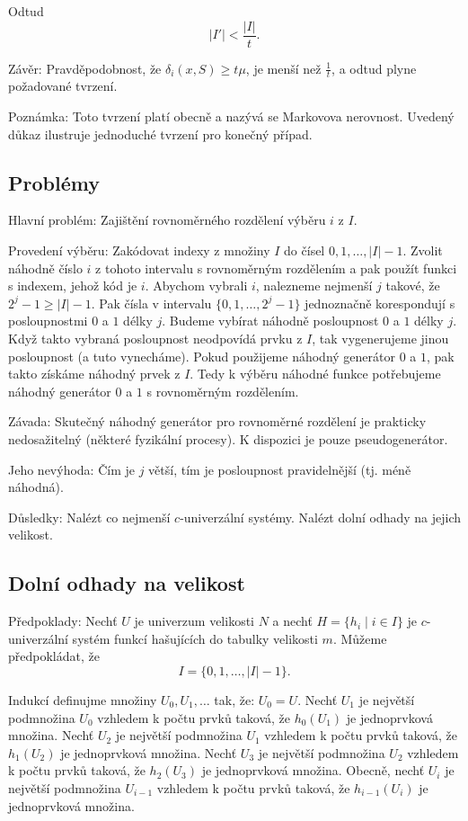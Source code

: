 \documentclass[a4paper,12pt]{article}
\begin{document}
Odtud
$$|I'|<\frac {|I|}t.$$

Závěr: Pravděpodobnost, že $\delta_i(x,S)\ge 
t\mu$, je menší 
než $\frac 1t$, a odtud plyne požadované tvrzení. 

Poznámka: Toto tvrzení platí obecně a nazývá 
se Markovova nerovnost. Uvedený důkaz 
ilustruje jednoduché tvrzení pro ko\-neč\-ný případ.

\subsection{
Problémy
}

Hlavní problém: Zajištění rovnoměrného rozdělení 
výběru $i$ z $I$.

Provedení výběru: Zak\'odovat indexy z množiny $
I$ do 
čísel $0,1,\dots,|I|-1$. Zvolit náhodně číslo $
i$ z tohoto 
intervalu s rovnoměrným rozdělením a pak použít 
funkci s indexem, jehož k\'od je $i$. Abychom vybrali $i$, nalezneme 
nejmenší $j$ takové, že $2^j-1\ge |I|-1$. Pak čísla v 
intervalu $\{0,1,\dots,2^j-1\}$ jednoznačně korespondují s 
posloupnostmi $0$ a $1$ délky $j$. Budeme vybírat náhodně 
posloupnost $0$ a $1$ délky $j$. Když takto vybraná posloupnost neodpovídá prvku z $I$, tak vygenerujeme jinou posloupnost (a tuto vynecháme). Pokud použijeme náhodný generátor $0$ a $1$, pak takto získáme náhodný prvek z $I$. Tedy k výběru náhodné funkce potřebujeme  
náhodný generátor $0$ a $1$ s rovnoměrným rozděle\-ním.

Závada: Skutečný náhodný generátor pro 
rovnoměrné rozděle\-ní je prakticky nedosažitelný 
(některé fyzikální procesy). K dispozici je pouze 
pseudogenerátor. 

Jeho nevýhoda: \v Cím je $j$ větší, tím je 
posloupnost pravidelnější (tj. méně náhodná). 

Důsledky: Nalézt co nejmenší $c$-univerzální 
systémy. Nalézt dolní odhady na jejich velikost.

\subsection{
Dolní odhady na velikost
}

Předpoklady: Nechť $U$ je univerzum velikosti $N$ a nechť 
$H=\{h_i\mid i\in I\}$ je $c$-univerzální systém funkcí hašujících do tabulky velikosti 
$m$. Můžeme předpoklá\-dat, že 
$$I=\{0,1,\dots,|I|-1\}.$$

Indukcí definujme množiny $U_0,U_1,\dots$ tak, že: 
$U_0=U$.\newline 
Nechť $U_1$ je největší podmnožina $U_0$ vzhledem k počtu 
prvků taková, že $h_0(U_1)$ je jednoprvková 
množina. \newline 
Nechť $U_2$ je největší podmnožina $U_1$ vzhledem k počtu 
prvků taková, že $h_1(U_2)$ je jednoprvková 
množina. \newline 
Nechť $U_3$ je největší podmnožina $U_2$ vzhledem k počtu 
prvků taková, že $h_2(U_3)$ je jednoprvková 
množina. \newline 
Obecně, nechť $U_i$ je největší podmnožina $U_{
i-1}$ vzhledem k počtu 
prvků taková, že $h_{i-1}(U_i)$ je jednoprvková 
množina. 
\end{document}
